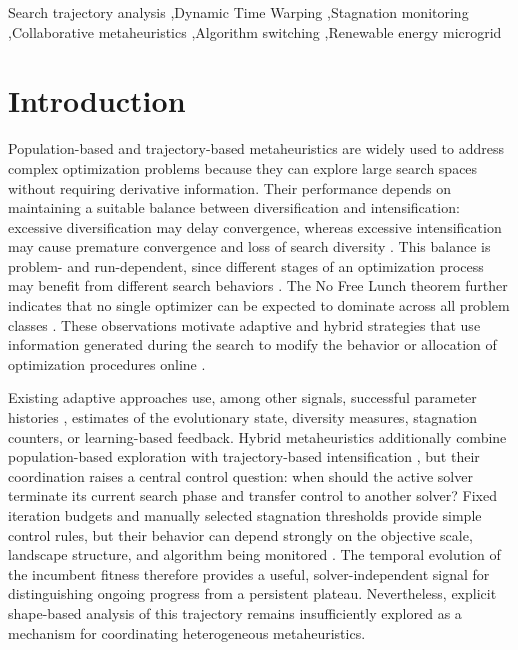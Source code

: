 \documentclass[review]{elsarticle}
\begin{document}
\begin{frontmatter}
\begin{keyword}
Search trajectory analysis \sep Dynamic Time Warping \sep Stagnation monitoring \sep Collaborative metaheuristics \sep Algorithm switching \sep Renewable energy microgrid
\end{keyword}


\end{frontmatter}

\section{Introduction}
\label{sec:introduction}

Population-based and trajectory-based metaheuristics are widely used to address complex optimization problems because they can explore large search spaces without requiring derivative information. Their performance depends on maintaining a suitable balance between diversification and intensification: excessive diversification may delay convergence, whereas excessive intensification may cause premature convergence and loss of search diversity \cite{akbulut2026artificial}. This balance is problem- and run-dependent, since different stages of an optimization process may benefit from different search behaviors \cite{vega2021learning}. The No Free Lunch theorem further indicates that no single optimizer can be expected to dominate across all problem classes \cite{wolpert1997no}. These observations motivate adaptive and hybrid strategies that use information generated during the search to modify the behavior or allocation of optimization procedures online \cite{talbi2002taxonomy,pei2024learning}.

Existing adaptive approaches use, among other signals, successful parameter histories \cite{song2019review}, estimates of the evolutionary state, diversity measures, stagnation counters, or learning-based feedback. Hybrid metaheuristics additionally combine population-based exploration with trajectory-based intensification \cite{talbi2016combining,karimimamaghan2022machine}, but their coordination raises a central control question: when should the active solver terminate its current search phase and transfer control to another solver? \cite{talbi2021machine_tax} Fixed iteration budgets and manually selected stagnation thresholds provide simple control rules, but their behavior can depend strongly on the objective scale, landscape structure, and algorithm being monitored \cite{elhashash2025hybrid,pei2024learning}. The temporal evolution of the incumbent fitness therefore provides a useful, solver-independent signal for distinguishing ongoing progress from a persistent plateau. Nevertheless, explicit shape-based analysis of this trajectory remains insufficiently explored as a mechanism for coordinating heterogeneous metaheuristics.
\end{document}
